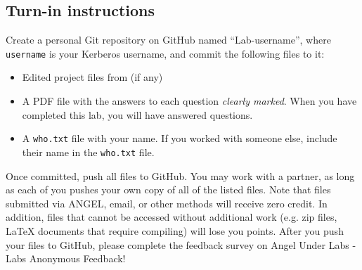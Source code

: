 \subsection*{Turn-in instructions}
Create a personal Git repository on GitHub named ``Lab\labnumber-username'', where \verb!username! is your Kerberos username, and commit the following files to it:
\begin{itemize}
\item Edited project files from \productname (if any)
\item A PDF file with the answers to each question \textit{clearly marked}. When you have completed this lab, you will have answered  questions.
\item A \verb!who.txt! file with your name. If you worked with someone else, include their name in the \verb!who.txt! file.
\end{itemize}

Once committed, push all files to GitHub. You may work with a partner, as long as each of you pushes your own copy of all of the listed files. Note that files submitted via ANGEL, email, or other methods will receive zero credit. In addition, files that cannot be accessed without additional work (e.g. zip files, LaTeX documents that require compiling) will lose you points. After you push your files to GitHub, please complete the feedback survey on Angel Under Labs - Labs Anonymous Feedback!
